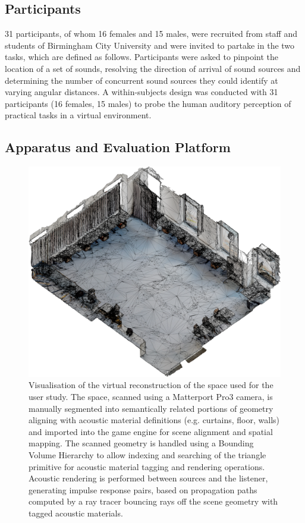 \subsection{Participants}
31 participants, of whom 16 females and 15 males, were recruited from staff and students of Birmingham City University and were invited to partake in the two tasks, which are defined as follows. Participants were asked to pinpoint the location of a set of sounds, resolving the direction of arrival of sound sources and determining the number of concurrent sound sources they could identify at varying angular distances. A within-subjects design was conducted with 31 participants (16 females, 15 males) to probe the human auditory perception of practical tasks in a virtual environment.

\subsection{Apparatus and Evaluation Platform}
\begin{figure}[htbp]%
    \centering
    \includegraphics[width=1\columnwidth]{7_evaluation/images/cst_isoview.png}
    \caption{Visualisation of the virtual reconstruction of the space used for the user study. The space, scanned using a Matterport Pro3 camera, is manually segmented into semantically related portions of geometry aligning with acoustic material definitions (e.g. curtains, floor, walls) and imported into the game engine for scene alignment and spatial mapping. The scanned geometry is handled using a Bounding Volume Hierarchy to allow indexing and searching of the triangle primitive for acoustic material tagging and rendering operations. Acoustic rendering is performed between sources and the listener, generating impulse response pairs, based on propagation paths computed by a ray tracer bouncing rays off the scene geometry with tagged acoustic materials.}
    \label{fig:cst-mesh}
\end{figure}
